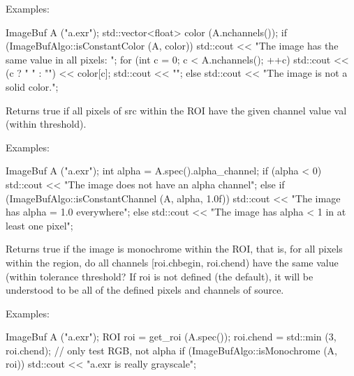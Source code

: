 \smallskip
\noindent Examples:
\begin{code}
    ImageBuf A ("a.exr");
    std::vector<float> color (A.nchannels());
    if (ImageBufAlgo::isConstantColor (A, color)) {
        std::cout << "The image has the same value in all pixels: ";
        for (int c = 0;  c < A.nchannels();  ++c)
            std::cout << (c ? " " : "") << color[c];
        std::cout << "\n";
    } else {
        std::cout << "The image is not a solid color.\n";
    }
\end{code}
\apiend


 

Returns {\cf true} if all pixels of {\cf src} within the ROI have the
given {\cf channel} value {\cf val} (within {\cf threshold}).

\smallskip
\noindent Examples:
\begin{code}
    ImageBuf A ("a.exr");
    int alpha = A.spec().alpha_channel;
    if (alpha < 0)
        std::cout << "The image does not have an alpha channel\n";
    else if (ImageBufAlgo::isConstantChannel (A, alpha, 1.0f))
        std::cout << "The image has alpha = 1.0 everywhere\n";
    else
        std::cout << "The image has alpha < 1 in at least one pixel\n";
\end{code}
\apiend

 

Returns {\cf true} if the image is monochrome within the ROI, that is, for
all pixels within the region, do all channels {\cf [roi.chbegin, roi.chend)}
have the same value (within tolerance {\cf threshold}?  If roi is not
defined (the default), it will be understood to be all of the defined pixels
and channels of source.

\smallskip
\noindent Examples:
\begin{code}
    ImageBuf A ("a.exr");
    ROI roi = get_roi (A.spec());
    roi.chend = std::min (3, roi.chend);  // only test RGB, not alpha
    if (ImageBufAlgo::isMonochrome (A, roi))
        std::cout << "a.exr is really grayscale\n";
\end{code}
\apiend


